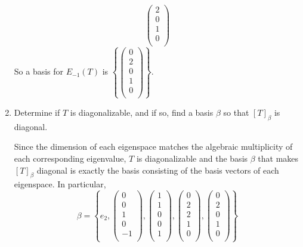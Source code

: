 \documentclass{eh-homework}
\begin{document}
\begin{question}{2}
\begin{enumerate}[label=(\alph*)]
\[\begin{pmatrix}
                 2 \\
                 0 \\
                 1 \\
                 0 \\
            \end{pmatrix}
        \]
        So a basis for \(E_{-1}(T)\) is \(\left\{ \begin{pmatrix}
            0 \\
            2 \\
            0 \\
            1 \\
            0 \\
       \end{pmatrix} \right\}\).

        \item Determine if $T$ is diagonalizable, and if so, find a basis $\beta$ so that $[T]_\beta$ is diagonal.
        
        Since the dimension of each eigenspace matches the algebraic multiplicity of each corresponding eigenvalue, \(T\) is diagonalizable and the basis \(\beta\) that makes \([T]_\beta\) diagonal is exactly the basis consisting of the basis vectors of each eigenspace. In particular,
        \[
            \beta = \left\{ e_2, \begin{pmatrix}
                0 \\
                0 \\
                1 \\
                0 \\
                -1 \\
           \end{pmatrix},\begin{pmatrix}
            1 \\
            1 \\
            0 \\
            0 \\
            1 \\
       \end{pmatrix},\begin{pmatrix}
            0 \\
            2 \\
            2 \\
            1 \\
            0 \\
        \end{pmatrix},\begin{pmatrix}
            0 \\
            2 \\
            0 \\
            1 \\
            0 \\
       \end{pmatrix} \right\} 
        \]
    \end{enumerate}
    \end{question}
    
\end{document}
